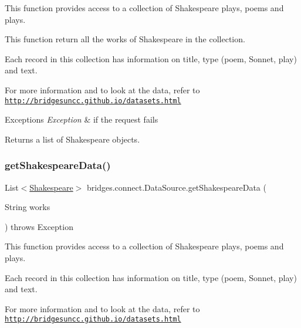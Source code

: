 This function provides access to a collection of Shakespeare plays, poems and plays. 

This function return all the works of Shakespeare in the collection.

Each record in this collection has information on title, type (poem, Sonnet, play) and text.

For more information and to look at the data, refer to \href{http://bridgesuncc.github.io/datasets.html}{\tt http\+://bridgesuncc.\+github.\+io/datasets.\+html}


\begin{DoxyExceptions}{Exceptions}
{\em Exception} & if the request fails\\
\hline
\end{DoxyExceptions}
\begin{DoxyReturn}{Returns}
a list of Shakespeare objects. 
\end{DoxyReturn}
\mbox{\label{classbridges_1_1connect_1_1_data_source_a04aa757c45139e52525d4b09156abfe1}} 
\subsubsection{\texorpdfstring{get\+Shakespeare\+Data()}{getShakespeareData()}\hspace{0.1cm}{\footnotesize\ttfamily [2/3]}}
{\footnotesize\ttfamily List$<$\hyperlink{classbridges_1_1data__src__dependent_1_1_shakespeare}{Shakespeare}$>$ bridges.\+connect.\+Data\+Source.\+get\+Shakespeare\+Data (\begin{DoxyParamCaption}\item[{String}]{works }\end{DoxyParamCaption}) throws Exception}



This function provides access to a collection of Shakespeare plays, poems and plays. 

Each record in this collection has information on title, type (poem, Sonnet, play) and text.

For more information and to look at the data, refer to \href{http://bridgesuncc.github.io/datasets.html}{\tt http\+://bridgesuncc.\+github.\+io/datasets.\+html}

